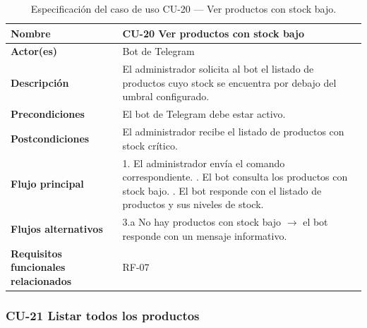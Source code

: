 \begin{table}[H]
\centering
\small
\begin{tabular}{|m{}|m{}|}
\hline
\textbf{Nombre} & CU-20 Ver productos con stock bajo \\ \hline
\textbf{Actor(es)} & Bot de Telegram \\ \hline
\textbf{Descripción} & El administrador solicita al bot el listado de productos cuyo stock se encuentra por debajo del umbral configurado. \\ \hline
\textbf{Precondiciones} & El bot de Telegram debe estar activo. \\ \hline
\textbf{Postcondiciones} & El administrador recibe el listado de productos con stock crítico. \\ \hline
\textbf{Flujo principal} & 1. El administrador envía el comando correspondiente. \newline 2. El bot consulta los productos con stock bajo. \newline 3. El bot responde con el listado de productos y sus niveles de stock. \\ \hline
\textbf{Flujos alternativos} & 3.a No hay productos con stock bajo $\rightarrow$ el bot responde con un mensaje informativo. \\ \hline
\textbf{Requisitos funcionales relacionados} & RF-07 \\ \hline
\end{tabular}
\caption{Especificación del caso de uso CU-20 — Ver productos con stock bajo.}
\end{table}

\clearpage

\subsubsection{CU-21 Listar todos los productos}

